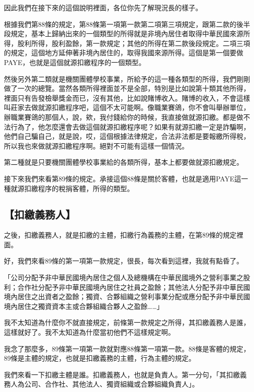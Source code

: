 \documentclass[oneside,sub3section]{ctexbook}
\begin{document}
因此我們在接下來的這個說明裡面，各位你先了解現況長的樣子。

根據我們第88條的規定，第88條第一項第一款第二項第三項規定，跟第二款的後半段規定，基本上歸納出來的一個類型的所得就是非境內居住者取得中華民國來源所得，股利所得，股利盈餘，第一款規定；其他的所得在第二款後段規定。二項三項的規定，這個地方延伸著非境內居住的，取得我國來源所得。這個是第一個要做PAYE，也就是這個就源扣繳程序的一個類型。

然後另外第二類就是機關團體學校事業，所給予的這一種各類型的所得，我們剛剛做了一次的總覽。當然各類所得裡面並不是全部，特別是比如說第十類其他所得，裡面只有告發檢舉獎金而已，沒有其他，比如說賭博收入。賭博的收入，不會這樣叫莊家去做就源扣繳程序吧，這個不太可能啊。像職業賽鴿，你不會叫舉辦單位，辦職業賽鴿的那個人，說，欸，我付錢給你的時候，我直接做就源扣繳。都是做不法行為了，他怎麼還會去做這個就源扣繳程序呢？如果有就源扣繳一定是詐騙啊，他們自己騙自己，就是說，哎，這個根據法律規定，合法非法都是要報繳所得稅，所以我也來做就源扣繳程序啊。絕對不可能有這樣一個情況。

第二種就是只要機關團體學校事業給的各類所得，基本上都要做就源扣繳規定。

接下來我們來看第89條的規定。承接這個88條是關於客體，也就是適用PAYE這一種就源扣繳程序的稅捐客體，所得的類型。

\hypertarget{ux6263ux7e73ux7fa9ux52d9ux4eba}{%
\subsection{【扣繳義務人】}\label{ux6263ux7e73ux7fa9ux52d9ux4eba}}

之後，扣繳義務人，就是扣繳的主體，扣繳行為義務的主體，在第89條的規定裡面。

好，我們來看89條的第一項第一款規定，很長，每次看到這裡，我就有點昏了。

「公司分配予非中華民國境內居住之個人及總機構在中華民國境外之營利事業之股利；合作社分配予非中華民國境內居住之社員之盈餘；其他法人分配予非中華民國境內居住之出資者之盈餘；獨資、合夥組織之營利事業分配或應分配予非中華民國境內居住之獨資資本主或合夥組織合夥人之盈餘\ldots\ldots」

我不太知道為什麼你不就直接規定，前條第一款規定之所得，其扣繳義務人是誰，這樣就好了。我不太知道為什麼當初他們不這樣規定啊。

我念了那麼多，89條第一項第一款就對應88條第一項第一款。88條是客體的規定，89條是主體的規定，也就是扣繳義務的主體，行為主體的規定。

我們來看一下扣繳主體是誰。扣繳義務人，也就是負責人。第一分句，「其扣繳義務人為公司、合作社、其他法人、獨資組織或合夥組織負責人」。
\end{document}
